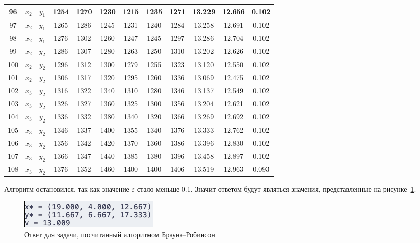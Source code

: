 \begin{longtable}[H]{c|c|c|c|c|c|c|c|c|c|c|c|}
    96 & $x_2$ & $y_1$ & 1254 & 1270 & 1230 & 1215 & 1235 & 1271 & 13.229 & 12.656 & 0.102 \\ \hline
    97 & $x_2$ & $y_1$ & 1265 & 1286 & 1245 & 1231 & 1240 & 1284 & 13.258 & 12.691 & 0.102 \\ \hline
    98 & $x_2$ & $y_1$ & 1276 & 1302 & 1260 & 1247 & 1245 & 1297 & 13.286 & 12.704 & 0.102 \\ \hline
    99 & $x_2$ & $y_2$ & 1286 & 1307 & 1280 & 1263 & 1250 & 1310 & 13.202 & 12.626 & 0.102 \\ \hline
    100 & $x_2$ & $y_2$ & 1296 & 1312 & 1300 & 1279 & 1255 & 1323 & 13.120 & 12.550 & 0.102 \\ \hline
    101 & $x_2$ & $y_2$ & 1306 & 1317 & 1320 & 1295 & 1260 & 1336 & 13.069 & 12.475 & 0.102 \\ \hline
    102 & $x_3$ & $y_2$ & 1316 & 1322 & 1340 & 1310 & 1280 & 1346 & 13.137 & 12.549 & 0.102 \\ \hline
    103 & $x_3$ & $y_2$ & 1326 & 1327 & 1360 & 1325 & 1300 & 1356 & 13.204 & 12.621 & 0.102 \\ \hline
    104 & $x_3$ & $y_2$ & 1336 & 1332 & 1380 & 1340 & 1320 & 1366 & 13.269 & 12.692 & 0.102 \\ \hline
    105 & $x_3$ & $y_2$ & 1346 & 1337 & 1400 & 1355 & 1340 & 1376 & 13.333 & 12.762 & 0.102 \\ \hline
    106 & $x_3$ & $y_2$ & 1356 & 1342 & 1420 & 1370 & 1360 & 1386 & 13.396 & 12.830 & 0.102 \\ \hline
    107 & $x_3$ & $y_2$ & 1366 & 1347 & 1440 & 1385 & 1380 & 1396 & 13.458 & 12.897 & 0.102 \\ \hline
    108 & $x_3$ & $y_2$ & 1376 & 1352 & 1460 & 1400 & 1400 & 1406 & 13.519 & 12.963 & 0.093 \\ \hline
\end{longtable}

Алгоритм остановился, так как значение $\varepsilon$ стало меньше 0.1. Значит ответом будут являться
значения, представленные на рисунке~\ref{fig:fig3}.

\begin{figure}
  \centering
  \includegraphics[scale=0.7]{../../artifacts/lw1/brown_robinson_solution.png}
  \caption{Ответ для задачи, посчитанный алгоритмом Брауна--Робинсон}
  \label{fig:fig3}
\end{figure}
